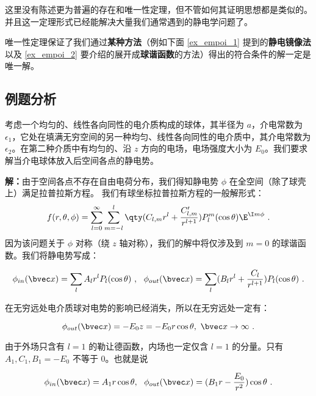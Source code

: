 这里没有陈述更为普遍的存在和唯一性定理，但不管如何其证明思想都是类似的。并且这一定理形式已经能解决大量我们通常遇到的静电学问题了。

唯一性定理保证了我们通过\textbf{某种方法}（例如下面 \autoref{ex_empoi_1} 提到的\textbf{静电镜像法}以及 \autoref{ex_empoi_2} 要介绍的展开成\textbf{球谐函数}的方法）得出的符合条件的解一定是唯一解。

\subsection{例题分析}
\begin{example}{}\label{ex_empoi_2}
考虑一个均匀的、线性各向同性的电介质构成的球体，其半径为 $a$，介电常数为 $\epsilon_1$，它处在填满无穷空间的另一种均匀、线性各向同性的电介质中，其介电常数为 $\epsilon_2$。在第二种介质中有均匀的、沿 $z$ 方向的电场，电场强度大小为 $E_0$。我们要求解当介电球体放入后空间各点的静电势。

\end{example}

\textbf{解：}由于空间各点不存在自由电荷分布，我们得知静电势 $\phi$ 在全空间（除了球壳上）满足拉普拉斯方程。
我们有球坐标拉普拉斯方程的一般解形式：
\begin{equation}\label{eq_empoi_2}
f(r, \theta, \phi) = \sum_{l = 0}^\infty \sum_{m = -l}^l \qty(C_{l,m} r^l + \frac{C'_{l,m}}{r^{l+1}})P_l^m(\cos\theta)\E^{\I m\phi}~.
\end{equation}
因为该问题关于 $\phi$ 对称（绕 $z$ 轴对称），我们的解中将仅涉及到 $m=0$ 的球谐函数。我们将静电势写成：

\begin{equation}
\phi_{in}(\bvec x)=\sum_{l}A_lr^lP_l(\cos \theta)\ ,\ \ \phi_{out}(\bvec x)=\sum_{l}(B_lr^l+\frac{C_l}{r^{l+1}})P_l(\cos \theta)~.
\end{equation}

在无穷远处电介质球对电势的影响已经消失，所以在无穷远处一定有：

\begin{equation}
\phi_{out}(\bvec x)=-E_0z=-E_0r\cos\theta,\ \bvec x\rightarrow \infty~.
\end{equation}

由于外场只含有 $l=1$ 的勒让德函数，内场也一定仅含 $l=1$ 的分量。只有 $A_1,C_1,B_1=-E_0$ 不等于 $0$。也就是说

\begin{equation}
\phi_{in}(\bvec x)=A_1r\cos \theta,\ \
\phi_{out}(\bvec x)=(B_1r-\frac{E_0}{r^{2}})\cos\theta~.
\end{equation}

